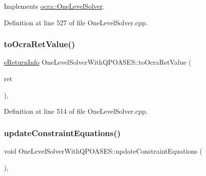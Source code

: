 Implements \hyperlink{classocra_1_1OneLevelSolver_aeb4fb349df382921c5c0064d7a05c48b}{ocra\+::\+One\+Level\+Solver}.



Definition at line 527 of file One\+Level\+Solver.\+cpp.

\hypertarget{classocra_1_1OneLevelSolverWithQPOASES_a8fa99c1dbded56a7ecc69a3d756f1277}{}\label{classocra_1_1OneLevelSolverWithQPOASES_a8fa99c1dbded56a7ecc69a3d756f1277} 
\subsubsection{\texorpdfstring{to\+Ocra\+Ret\+Value()}{toOcraRetValue()}}
{\footnotesize\ttfamily \hyperlink{namespaceocra_aa1d873ac30cb0a0f79ba978745de294b}{e\+Return\+Info} One\+Level\+Solver\+With\+Q\+P\+O\+A\+S\+E\+S\+::to\+Ocra\+Ret\+Value (\begin{DoxyParamCaption}\item[{const qp\+O\+A\+S\+E\+S\+::return\+Value \&}]{ret }\end{DoxyParamCaption})\hspace{0.3cm}{\ttfamily [static]}, {\ttfamily [protected]}}



Definition at line 514 of file One\+Level\+Solver.\+cpp.

\hypertarget{classocra_1_1OneLevelSolverWithQPOASES_abbe458ba193d545d6c07b09f582d6ce7}{}\label{classocra_1_1OneLevelSolverWithQPOASES_abbe458ba193d545d6c07b09f582d6ce7} 
\subsubsection{\texorpdfstring{update\+Constraint\+Equations()}{updateConstraintEquations()}}
{\footnotesize\ttfamily void One\+Level\+Solver\+With\+Q\+P\+O\+A\+S\+E\+S\+::update\+Constraint\+Equations (\begin{DoxyParamCaption}{ }\end{DoxyParamCaption})\hspace{0.3cm}{\ttfamily [protected]}, {\ttfamily [virtual]}}



